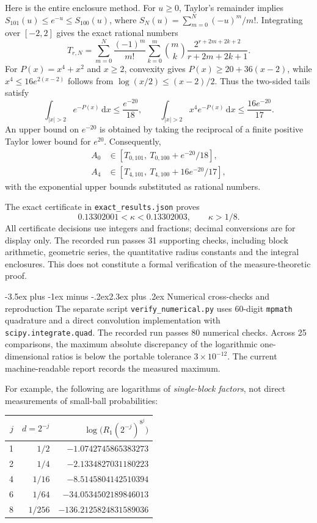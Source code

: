\documentclass[11pt]{article}
\makeatletter
\renewcommand{\section}{\@startsection{section}{1}{0pt}
  {-3.5ex plus -1ex minus -.2ex}{2.3ex plus .2ex}
  {\normalfont\large\bfseries\color{MidnightBlue}}}
\theoremstyle{remark}
\newcommand{\dd}{\,\mathrm d}
\newcommand{\code}[1]{\texttt{#1}}
\makeatother
\begin{document}
Here is the entire enclosure method. For $u\ge0$, Taylor's remainder implies
$S_{101}(u)\le e^{-u}\le S_{100}(u)$, where
$S_N(u)=\sum_{m=0}^N(-u)^m/m!$.
Integrating over $[-2,2]$ gives the exact rational numbers
\[
T_{r,N}=\sum_{m=0}^N\frac{(-1)^m}{m!}
\sum_{k=0}^m\binom mk\frac{2^{r+2m+2k+2}}{r+2m+2k+1}.
\]
For $P(x)=x^4+x^2$ and $x\ge2$, convexity gives
$P(x)\ge20+36(x-2)$, while
$x^4\le16e^{2(x-2)}$ follows from $\log(x/2)\le(x-2)/2$.
Thus the two-sided tails satisfy
\[
\int_{|x|>2}e^{-P(x)}\dd x\le\frac{e^{-20}}{18},\qquad
\int_{|x|>2}x^4e^{-P(x)}\dd x\le\frac{16e^{-20}}{17}.
\]
An upper bound on $e^{-20}$ is obtained by taking the reciprocal of a finite positive Taylor lower bound for $e^{20}$. Consequently,
\begin{align*}
A_0&\in[T_{0,101},\ T_{0,100}+e^{-20}/18],\\
A_4&\in[T_{4,101},\ T_{4,100}+16e^{-20}/17],
\end{align*}
with the exponential upper bounds substituted as rational numbers.

The exact certificate in \code{exact\_results.json} proves
\[
0.13302001<\kappa<0.13302003,\qquad \kappa>1/8.
\]
All certificate decisions use integers and fractions; decimal conversions are for display only. The recorded run passes 31 supporting checks, including block arithmetic, geometric series, the quantitative radius constants and the integral enclosures. This does not constitute a formal verification of the measure-theoretic proof.

\section{Numerical cross-checks and reproduction}\label{app:numerics}
The separate script \code{verify\_numerical.py} uses 60-digit \code{mpmath} quadrature and a direct convolution implementation with \code{scipy.integrate.quad}. The recorded run passes 80 numerical checks. Across 25 comparisons, the maximum absolute discrepancy of the logarithmic one-dimensional ratios is below the portable tolerance $3\times10^{-12}$. The current machine-readable report records the measured maximum.

For example, the following are logarithms of \emph{single-block factors}, not direct measurements of small-ball probabilities:
\begin{center}
\begin{tabular}{rrr}
\toprule
$j$ & $d=2^{-j}$ & $\log\bigl(R_1(2^{-j})^{8^j}\bigr)$ \\
\midrule
1 & $1/2$ & $-1.0742745865383273$ \\
2 & $1/4$ & $-2.1334827031180223$ \\
4 & $1/16$ & $-8.5145804142510394$ \\
6 & $1/64$ & $-34.0534502189846013$ \\
8 & $1/256$ & $-136.2125824831589036$ \\
\bottomrule
\end{tabular}
\end{center}
\end{document}

